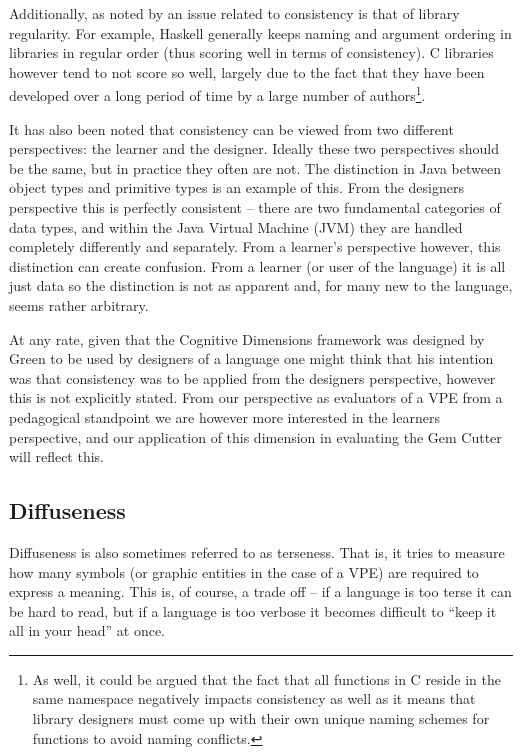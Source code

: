 Additionally, as noted by \cite{Kelso02} an issue related to consistency is that of library regularity.  For example, Haskell generally keeps naming and argument ordering in libraries in regular order (thus scoring well in terms of consistency).  C libraries however tend to not score so well, largely due to the fact that they have been developed over a long period of time by a large number of authors\footnote{As well, it could be argued that the fact that all functions in C reside in the same namespace negatively impacts consistency as well as it means that library designers must come up with their own unique naming schemes for functions to avoid naming conflicts.}.

It has also been noted that consistency can be viewed from two different perspectives: the learner and the designer. \cite{Reisner93} Ideally these two perspectives should be the same, but in practice they often are not.  The distinction in Java between object types and primitive types is an example of this.  From the designers perspective this is perfectly consistent -- there are two fundamental categories of data types, and within the Java Virtual Machine (JVM) they are handled completely differently and separately.  From a learner's perspective however, this distinction can create confusion.  From a learner (or user of the language) it is all just data so the distinction is not as apparent and, for many new to the language, seems rather arbitrary.

At any rate, given that the Cognitive Dimensions framework was designed by Green to be used by designers of a language one might think that his intention was that consistency was to be applied from the designers perspective, however this is not explicitly stated.  From our perspective as evaluators of a VPE from a pedagogical standpoint we are however more interested in the learners perspective, and our application of this dimension in evaluating the Gem Cutter will reflect this.

\subsection{Diffuseness}
\label{diffusenessoutline}

Diffuseness is also sometimes referred to as terseness.  That is, it tries to measure how many symbols (or graphic entities in the case of a VPE) are required to express a meaning.  This is, of course, a trade off -- if a language is too terse it can be hard to read, but if a language is too verbose it becomes difficult to ``keep it all in your head'' at once.

